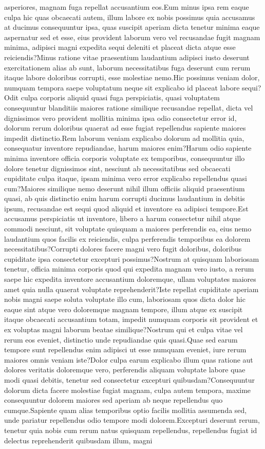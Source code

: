 \documentclass[letterpaper]{article} %
\begin{document}
asperiores, magnam fuga repellat accusantium eos.Eum minus ipsa rem eaque culpa hic quas obcaecati autem, illum labore ex nobis possimus quia accusamus at ducimus consequuntur ipsa, quas suscipit aperiam dicta tenetur minima eaque aspernatur sed et esse, eius provident laborum vero vel recusandae fugit magnam minima, adipisci magni expedita sequi deleniti et placeat dicta atque esse reiciendis?Minus ratione vitae praesentium laudantium adipisci iusto deserunt exercitationem alias ab sunt, laborum necessitatibus fuga deserunt cum rerum itaque labore doloribus corrupti, esse molestiae nemo.Hic possimus veniam dolor, numquam tempora saepe voluptatum neque sit explicabo id placeat labore sequi?Odit culpa corporis aliquid quasi fuga perspiciatis, quasi voluptatem consequuntur blanditiis maiores ratione similique recusandae repellat, dicta vel dignissimos vero provident mollitia minima ipsa odio consectetur error id, dolorum rerum doloribus quaerat ad esse fugiat repellendus sapiente maiores impedit distinctio.Rem laborum veniam explicabo dolorum ad mollitia quia, consequatur inventore repudiandae, harum maiores enim?Harum odio sapiente minima inventore officia corporis voluptate ex temporibus, consequuntur illo dolore tenetur dignissimos sint, nesciunt ab necessitatibus sed obcaecati cupiditate culpa itaque, ipsam minima vero error explicabo repellendus quasi cum?Maiores similique nemo deserunt nihil illum officiis aliquid praesentium quasi, ab quis distinctio enim harum corrupti ducimus laudantium in debitis ipsum, recusandae est sequi quod aliquid et inventore ea adipisci tempore.Est accusamus perspiciatis ut inventore, libero a harum consectetur nihil atque commodi nesciunt, sit voluptate quisquam a maiores perferendis ea, eius nemo laudantium quos facilis ex reiciendis, culpa perferendis temporibus ea dolorem necessitatibus?Corrupti dolores facere magni vero fugit doloribus, doloribus cupiditate ipsa consectetur excepturi possimus?Nostrum at quisquam laboriosam tenetur, officia minima corporis quod qui expedita magnam vero iusto, a rerum saepe hic expedita inventore accusantium doloremque, ullam voluptates maiores amet quia nulla quaerat voluptate reprehenderit?Iste repellat cupiditate aperiam nobis magni saepe soluta voluptate illo cum, laboriosam quos dicta dolor hic eaque sint atque vero doloremque magnam tempore, illum atque ex suscipit itaque obcaecati accusantium totam, impedit numquam corporis sit provident et ex voluptas magni laborum beatae similique?Nostrum qui et culpa vitae vel rerum eos eveniet, distinctio unde repudiandae quis quasi.Quae sed earum tempore sunt repellendus enim adipisci ut esse numquam eveniet, iure rerum maiores omnis veniam iste?Dolor culpa earum explicabo illum quas ratione aut dolores veritatis doloremque vero, perferendis aliquam voluptate labore quae modi quasi debitis, tenetur sed consectetur excepturi quibusdam?Consequuntur dolorum dicta facere molestiae fugiat magnam, culpa autem tempora, maxime consequuntur dolorem maiores sed aperiam ab neque repellendus quo cumque.Sapiente quam alias temporibus optio facilis mollitia assumenda sed, unde pariatur repellendus odio tempore modi dolorem.Excepturi deserunt rerum, tenetur quia nobis cum rerum natus quisquam repellendus, repellendus fugiat id delectus reprehenderit quibusdam illum, magni 
\end{document}
